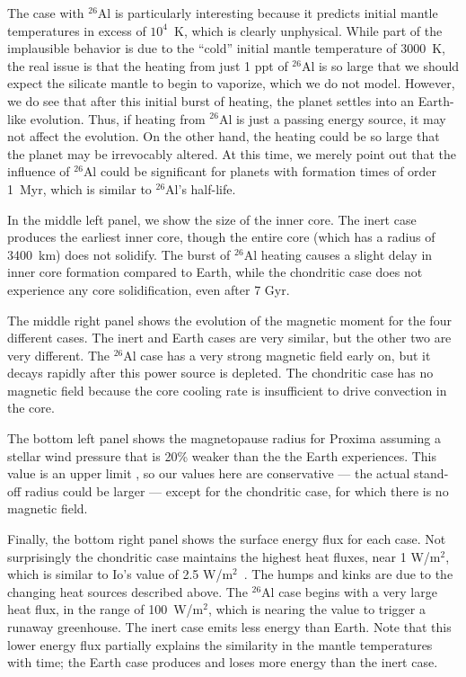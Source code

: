 \documentclass[preprint,12pt]{aastex}
\begin{document}
The case with $^{26}$Al is particularly interesting because it
predicts initial mantle temperatures in excess of $10^4$~K, which is
clearly unphysical. While part of the implausible behavior is due to
the ``cold'' initial mantle temperature of 3000~K, the real issue is
that the heating from just 1 ppt of $^{26}$Al is so large that we should expect the silicate mantle to begin to vaporize, which we do not model. However, we do see that after this initial
burst of heating, the planet settles into an Earth-like
evolution. Thus, if heating from $^{26}$Al is just a passing energy
source, it may not affect the evolution. On the other hand, the
heating could be so large that the planet may be irrevocably
altered. At this time, we merely point out that the influence of
$^{26}$Al could be significant for planets with formation times of
order 1~Myr, which is similar to $^{26}$Al's half-life.

In the middle left panel, we show the size of the inner core. The
inert case produces the earliest inner core, though the entire core (which has a radius of 3400~km) does not solidify. The burst of $^{26}$Al
heating causes a slight delay in inner core formation compared to Earth,
while the chondritic case does not experience any core solidification, even
after 7 Gyr.

The middle right panel shows the evolution of the magnetic moment for
the four different cases. The inert and Earth cases are very similar,
but the other two are very different. The $^{26}$Al case has a very
strong magnetic field early on, but it decays rapidly after this power
source is depleted. The chondritic case has no magnetic field because
the core cooling rate is insufficient to drive convection in the
core.

The bottom left panel shows the magnetopause radius for Proxima
assuming a stellar wind pressure that is 20\% weaker than the 
the Earth experiences. 
This value
is an upper limit \citep{Wood01}, so our values here are conservative
--- the actual stand-off radius could be larger --- except for the
chondritic case,
for which there is no magnetic field.

Finally, the bottom right panel shows the surface energy flux for each
case. Not surprisingly the chondritic case maintains the highest heat
fluxes, near 1 W/m$^2$, which is similar to Io's value of 2.5
W/m$^2$~\citep{Veeder94}. The humps and kinks are due to the changing
heat sources described above. The $^{26}$Al case begins with a very
large heat flux, in the range of 100~W/m$^2$, which is nearing the
value to trigger a runaway greenhouse. The inert case emits less
energy than Earth. Note that this lower energy flux partially explains
the similarity in the mantle temperatures with time; the Earth case
produces and loses more energy than the inert case.
\end{document}

